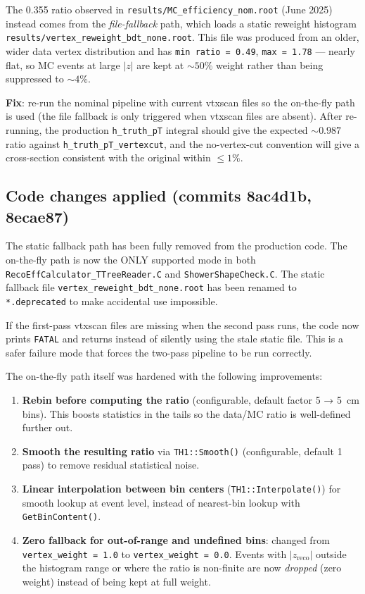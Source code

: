 \documentclass[11pt,letterpaper]{article}
\begin{document}
The 0.355 ratio observed in
\texttt{results/MC\_efficiency\_nom.root} (June 2025) instead comes
from the \emph{file-fallback} path, which loads a static reweight
histogram \texttt{results/vertex\_reweight\_bdt\_none.root}. This file
was produced from an older, wider data vertex distribution and has
\texttt{min ratio = 0.49}, \texttt{max = 1.78} --- nearly flat, so MC
events at large $|z|$ are kept at $\sim 50\%$ weight rather than
being suppressed to $\sim 4\%$.

\textbf{Fix}: re-run the nominal pipeline with current vtxscan files
so the on-the-fly path is used (the file fallback is only triggered
when vtxscan files are absent). After re-running, the production
\texttt{h\_truth\_pT} integral should give the expected $\sim 0.987$
ratio against \texttt{h\_truth\_pT\_vertexcut}, and the no-vertex-cut
convention will give a cross-section consistent with the original
within $\leq 1\%$.

\subsection{Code changes applied (commits 8ac4d1b, 8ecae87)}

The static fallback path has been fully removed from the production
code. The on-the-fly path is now the ONLY supported mode in both
\texttt{RecoEffCalculator\_TTreeReader.C} and
\texttt{ShowerShapeCheck.C}. The static fallback file
\texttt{vertex\_reweight\_bdt\_none.root} has been renamed to
\texttt{*.deprecated} to make accidental use impossible.

If the first-pass vtxscan files are missing when the second pass
runs, the code now prints \texttt{FATAL} and returns instead of
silently using the stale static file. This is a safer failure mode
that forces the two-pass pipeline to be run correctly.

The on-the-fly path itself was hardened with the following
improvements:

\begin{enumerate}
  \item \textbf{Rebin before computing the ratio} (configurable,
    default factor 5 → 5~cm bins). This boosts statistics in the
    tails so the data/MC ratio is well-defined further out.

  \item \textbf{Smooth the resulting ratio} via \texttt{TH1::Smooth()}
    (configurable, default 1 pass) to remove residual statistical
    noise.

  \item \textbf{Linear interpolation between bin centers}
    (\texttt{TH1::Interpolate()}) for smooth lookup at event level,
    instead of nearest-bin lookup with \texttt{GetBinContent()}.

  \item \textbf{Zero fallback for out-of-range and undefined bins}:
    changed from \texttt{vertex\_weight = 1.0} to
    \texttt{vertex\_weight = 0.0}. Events with $|z_{\text{reco}}|$
    outside the histogram range or where the ratio is non-finite are
    now \emph{dropped} (zero weight) instead of being kept at full
    weight.
\end{enumerate}
\end{document}
